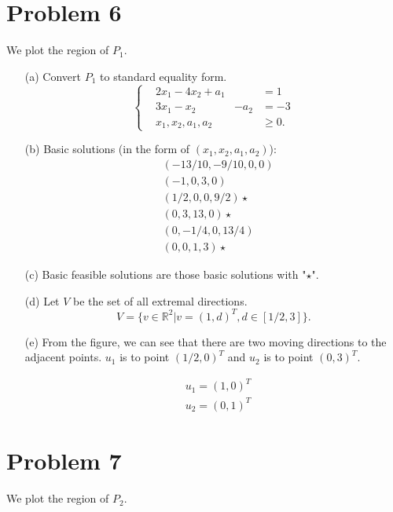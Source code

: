 \documentclass[12pt]{article}
\begin{document}
\section*{Problem 6}
We plot the region of $P_1$.


\begin{enumerate}
\item [(a)]
Convert $P_1$ to standard equality form.
$$
\left\{
\begin{aligned}
& 2x_1 - 4x_2 + a_1 & & = 1 \\
& 3x_1 - x_2   & -a_2 & = -3 \\
& x_1, x_2, a_1, a_2 & & \geqslant 0.
\end{aligned}
\right.
$$

\item[(b)]
Basic solutions (in the form of $(x_1, x_2, a_1, a_2)$): 
$$
\begin{aligned}
&(-13/10, -9/10, 0, 0)   \\ 
&(-1, 0, 3, 0)\\ 
&(1/2, 0, 0, 9/2) \star\\
& (0, 3, 13, 0)\star\\ 
 &(0, -1/4, 0, 13/4)\\
 & (0, 0, 1, 3)\star
\end{aligned}
$$

\item[(c)]
Basic feasible solutions are those basic solutions with "$\star$".

\item[(d)]
Let $V$ be the set of all extremal directions. 
$$
V = \{v \in\mathbb R^2| v = (1, d)^T, d\in [1/2, 3] \}.
$$

\item[(e)]
From the figure, we can see that there are two moving directions to the adjacent points. $u_1$ is to point $(1/2, 0)^T$ and $u_2$ is to point $(0, 3)^T$.

$$
\begin{aligned}
&u_1 = (1, 0)^T \\
&u_2 = (0, 1)^T 
\end{aligned}
$$
\end{enumerate}

\section*{Problem 7}

We plot the region of $P_2$.
%
\end{document}

